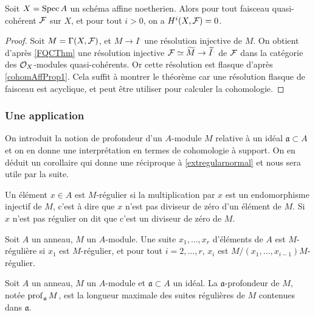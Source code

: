 \begin{thm}\label{cohomoaffine}
Soit $X=\operatorname{Spec} A$ un schéma affine noetherien. Alors pour tout faisceau quasi-cohérent $\mathcal{F}$ sur $X$, et pour tout $i>0$, on a $H^i(X,\mathcal{F})=0$. 
\end{thm}
\begin{proof}
Soit $M=\Gamma(X,\mathcal{F})$, et $M\rightarrow I^.$ une résolution injective de $M$. On obtient d'après \ref{FQCThm} une résolution injective $\mathcal{F}\simeq \widetilde{M}\rightarrow \widetilde{I}^.$ de $\mathcal{F}$ dans la catégorie des $\mathcal{O}_X$-modules quasi-cohérents. Or cette résolution est flasque d'après \ref{cohomAffProp1}. Cela suffit à montrer le théorème car une résolution flasque de faisceau est acyclique, et peut être utiliser pour calculer la cohomologie.
\end{proof}

\subsubsection{Une application}

On introduit la notion de profondeur d'un $A$-module $M$ relative à un idéal $\mathfrak{a}\subset A$ et on en donne une interprétation en termes de cohomologie à support. On en déduit un corollaire qui donne une réciproque à \ref{extregularnormal} et nous sera utile par la suite.

\begin{defn}
Un élément $x\in A$ est $M$-régulier si la multiplication par $x$ est un endomorphisme injectif de $M$, c'est à dire que $x$ n'est pas diviseur de zéro d'un élément de $M$. Si $x$ n'est pas régulier on dit que c'est un diviseur de zéro de $M$.
\end{defn}

\begin{defn}
Soit $A$ un anneau, $M$ un $A$-module. Une suite $x_1,...,x_r$ d'éléments de $A$ est $M$-régulière si $x_1$ est $M$-régulier, et pour tout $i=2,...,r$, $x_i$ est $M/(x_1,...,x_{i-1})M$-régulier.
\end{defn}

\begin{defn}[Profondeur]
Soit $A$ un anneau, $M$ un $A$-module et $\mathfrak{a}\subset A$ un idéal. La $\mathfrak{a}$-profondeur de $M$, notée $\operatorname{prof}_\mathfrak{a} M$, est la longueur maximale des suites régulières de $M$ contenues dans $\mathfrak{a}$.
\end{defn}

